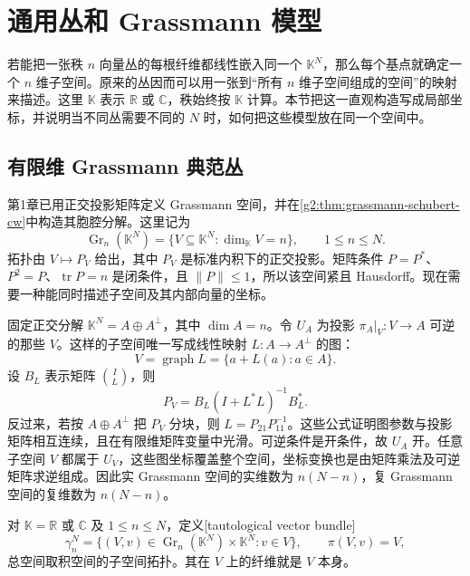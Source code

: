 
% 
% 

\section{通用丛和 Grassmann 模型}
\label{g2:sec:1902}

若能把一张秩 \(n\) 向量丛的每根纤维都线性嵌入同一个 \(\mathbb K^N\)，那么每个基点就确定一个 \(n\) 维子空间。原来的丛因而可以用一张到“所有 \(n\) 维子空间组成的空间”的映射来描述。这里 \(\mathbb K\) 表示 \(\mathbb R\) 或 \(\mathbb C\)，秩始终按 \(\mathbb K\) 计算。本节把这一直观构造写成局部坐标，并说明当不同丛需要不同的 \(N\) 时，如何把这些模型放在同一个空间中。

\subsection{有限维 Grassmann 典范丛}
\label{g2:subsec:1902:01}
第1章已用正交投影矩阵定义 Grassmann 空间，并在\cref{g2:thm:grassmann-schubert-cw}中构造其胞腔分解。这里记为
\[
	\operatorname{Gr}_n(\mathbb K^N)=\{V\subseteq\mathbb K^N:\dim_{\mathbb K}V=n\},\qquad 1\le n\le N.
\]
拓扑由 \(V\mapsto P_V\) 给出，其中 \(P_V\) 是标准内积下的正交投影。矩阵条件 \(P=P^*\)、\(P^2=P\)、\(\operatorname{tr}P=n\) 是闭条件，且 \(\|P\|\le1\)，所以该空间紧且 Hausdorff。现在需要一种能同时描述子空间及其内部向量的坐标。

\ProseParagraphBreak

固定正交分解 \(\mathbb K^N=A\oplus A^\perp\)，其中 \(\dim A=n\)。令 \(U_A\) 为投影 \(\pi_A|_V:V\to A\) 可逆的那些 \(V\)。这样的子空间唯一写成线性映射 \(L:A\to A^\perp\) 的图：
\[
	V=\operatorname{graph}L=\{a+L(a):a\in A\}.
\]
设 \(B_L\) 表示矩阵 \(\binom{I}{L}\)，则
\[
	P_V=B_L(I+L^*L)^{-1}B_L^*.
\]
反过来，若按 \(A\oplus A^\perp\) 把 \(P_V\) 分块，则 \(L=P_{21}P_{11}^{-1}\)。这些公式证明图参数与投影矩阵相互连续，且在有限维矩阵变量中光滑。可逆条件是开条件，故 \(U_A\) 开。任意子空间 \(V\) 都属于 \(U_V\)，这些图坐标覆盖整个空间，坐标变换也是由矩阵乘法及可逆矩阵求逆组成。因此实 Grassmann 空间的实维数为 \(n(N-n)\)，复 Grassmann 空间的复维数为 \(n(N-n)\)。

\begin{definition}\label{g2:def:finite-tautological-bundle}
	对 \(\mathbb K=\mathbb R\) 或 \(\mathbb C\) 及 \(1\le n\le N\)，定义[tautological vector bundle]
	\[
		\gamma_n^N=\{(V,v)\in\operatorname{Gr}_n(\mathbb K^N)\times\mathbb K^N:v\in V\},\qquad \pi(V,v)=V,
	\]
	总空间取积空间的子空间拓扑。其在 \(V\) 上的纤维就是 \(V\) 本身。
\end{definition}

